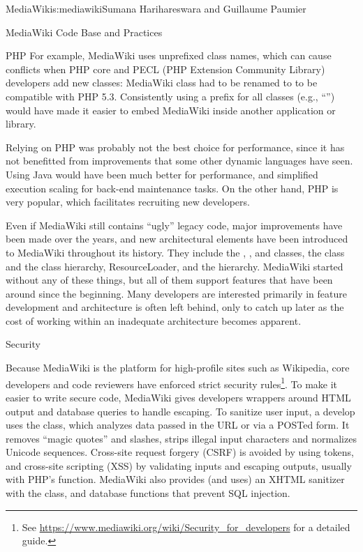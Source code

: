 \begin{aosachapter}{MediaWiki}{s:mediawiki}{Sumana Harihareswara and Guillaume Paumier}
\begin{aosasect1}{MediaWiki Code Base and Practices}
\begin{aosasect2}{PHP}
For example, MediaWiki uses unprefixed class names, which can cause
conflicts when PHP core and PECL (PHP Extension Community Library)
developers add new classes: MediaWiki  class had to be
renamed to  to be compatible with PHP
5.3. Consistently using a prefix for all classes (e.g., ``'')
would have made it easier to embed MediaWiki inside another
application or library.

Relying on PHP was probably not the best choice for performance, since
it has not benefitted from improvements that some other dynamic
languages have seen. Using Java would have been much better for
performance, and simplified execution scaling for back-end maintenance
tasks. On the other hand, PHP is very popular, which facilitates
recruiting new developers.

Even if MediaWiki still contains ``ugly'' legacy code, major
improvements have been made over the years, and new architectural
elements have been introduced to MediaWiki throughout its
history. They include the , , and
 classes, the  class and the
 class hierarchy, ResourceLoader, and the 
hierarchy. MediaWiki started without any of these things, but all of
them support features that have been around since the beginning. Many
developers are interested primarily in feature development and
architecture is often left behind, only to catch up later as the cost
of working within an inadequate architecture becomes apparent.

\end{aosasect2}

\begin{aosasect2}{Security}

Because MediaWiki is the platform for high-profile sites such as
Wikipedia, core developers and code reviewers have enforced strict
security rules\footnote{See
  \url{https://www.mediawiki.org/wiki/Security\_for\_developers} for a
  detailed guide.}. To make it easier to write secure code, MediaWiki
gives developers wrappers around HTML output and database queries to
handle escaping. To sanitize user input, a develop uses the
 class, which analyzes data passed in the URL or via
a POSTed form. It removes ``magic quotes'' and slashes, strips illegal input
characters and normalizes Unicode sequences. Cross-site request
forgery (CSRF) is avoided by using tokens, and cross-site scripting
(XSS) by validating inputs and escaping outputs, usually with PHP's
 function. MediaWiki also provides (and uses)
an XHTML sanitizer with the  class, and database
functions that prevent SQL injection.


\end{aosasect2}
\end{aosasect1}
\end{aosachapter}
